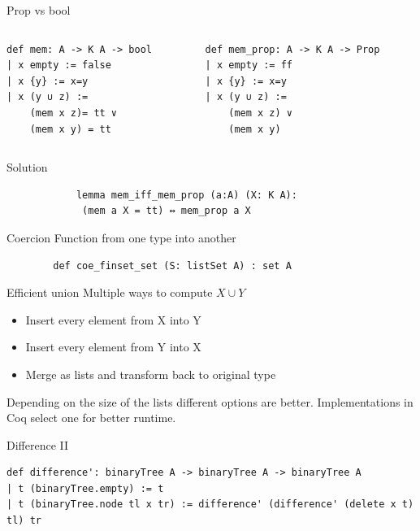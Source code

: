 \documentclass{beamer}
\begin{document}
\begin{frame}[fragile]{Prop vs bool}
    \begin{columns}
        \begin{column}{.5\textwidth}
            \begin{lstlisting}
def mem: A -> K A -> bool
| x empty := false
| x {y} := x=y
| x (y ∪ z) := 
    (mem x z)= tt ∨
    (mem x y) = tt
            \end{lstlisting}
        \end{column}
        \begin{column}{.5\textwidth}
            \begin{lstlisting}
def mem_prop: A -> K A -> Prop
| x empty := ff
| x {y} := x=y
| x (y ∪ z) := 
    (mem x z) ∨
    (mem x y)
            \end{lstlisting}
        \end{column}
    \end{columns}

    \begin{block}{Solution}
        \begin{lstlisting}
            lemma mem_iff_mem_prop (a:A) (X: K A):
             (mem a X = tt) ↔ mem_prop a X
        \end{lstlisting}
    \end{block}
\end{frame}

\begin{frame}[fragile]{Coercion}
    Function from one type into another

    \begin{lstlisting}
        def coe_finset_set (S: listSet A) : set A
    \end{lstlisting}
\end{frame}
\begin{frame}{Efficient union}
    Multiple ways to compute $X \cup Y$

    \begin{itemize}
        \item Insert every element from X into Y
        \item Insert every element from Y into X
        \item Merge as lists and transform back to original type
    \end{itemize}

    Depending on the size of the lists different options are better. 
    Implementations in Coq select one for better runtime.
\end{frame}

\begin{frame}[fragile]{Difference II}
    \begin{lstlisting}
def difference': binaryTree A -> binaryTree A -> binaryTree A
| t (binaryTree.empty) := t
| t (binaryTree.node tl x tr) := difference' (difference' (delete x t) tl) tr
    \end{lstlisting}
\end{frame}
\end{document}

